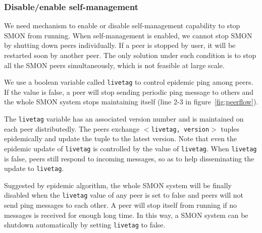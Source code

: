 
\subsubsection{Disable/enable self-management}
\label{subsec:livetag}

We need mechanism to enable or disable self-management
capability to stop SMON from running. When self-management
is enabled, we cannot stop SMON by shutting down peers
individually.  If a peer is stopped by user, it will be
restarted soon by another peer. The only solution under such
condition is to stop all the SMON peers simultaneously,
which is not feasible at large scale.

We use a boolean variable called \texttt{livetag} to control
epidemic ping among peers. If the value is false, a peer
will stop sending periodic ping message to others and the
whole SMON system stops maintaining itself (line 2-3 in
figure~\ref{fig:peerflow}).

The \texttt{livetag} variable has an associated version
number and is maintained on each peer distributedly. The
peers exchange \texttt{$<$livetag, version$>$} tuples
epidemically and update the tuple to the latest version.
Note that even the epidemic update of \texttt{livetag} is
controlled by the value of \texttt{livetag}.  When
\texttt{livetag} is false, peers still respond
to incoming messages, so as to
help disseminating the update to \texttt{livetag}.

Suggested by epidemic algorithm, the whole SMON system will
be finally disabled when the \texttt{livetag} value of any
peer is set to false and peers will not send ping messages
to each other. A peer will stop itself from running if no
messages is received for enough long time. In this way, a
SMON system can be shutdown automatically by setting
\texttt{livetag} to false.


%


